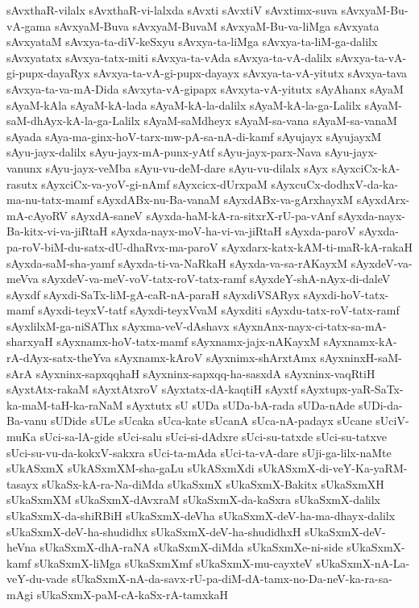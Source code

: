 {sAvxthaR-vilalx
sAvxthaR-vi-lalxda
sAvxti
sAvxtiV
sAvxtimx-suva
sAvxyaM-Bu-vA-gama
sAvxyaM-Buva
sAvxyaM-BuvaM
sAvxyaM-Bu-va-liMga
sAvxyata
sAvxyataM
sAvxya-ta-diV-keSxyu
sAvxya-ta-liMga
sAvxya-ta-liM-ga-dalilx
sAvxyatatx
sAvxya-tatx-miti
sAvxya-ta-vAda
sAvxya-ta-vA-dalilx
sAvxya-ta-vA-gi-pupx-dayaRyx
sAvxya-ta-vA-gi-pupx-dayayx
sAvxya-ta-vA-yitutx
sAvxya-tava
sAvxya-ta-va-mA-Dida
sAvxyta-vA-gipapx
sAvxyta-vA-yitutx
sAyAhanx
sAyaM
sAyaM-kAla
sAyaM-kA-lada
sAyaM-kA-la-dalilx
sAyaM-kA-la-ga-Lalilx
sAyaM-saM-dhAyx-kA-la-ga-Lalilx
sAyaM-saMdheyx
sAyaM-sa-vana
sAyaM-sa-vanaM
sAyada
sAya-ma-ginx-hoV-tarx-mw-pA-sa-nA-di-kamf
sAyujayx
sAyujayxM
sAyu-jayx-dalilx
sAyu-jayx-mA-punx-yAtf
sAyu-jayx-parx-Nava
sAyu-jayx-vanunx
sAyu-jayx-veMba
sAyu-vu-deM-dare
sAyu-vu-dilalx
sAyx
sAyxciCx-kA-rasutx
sAyxciCx-va-yoV-gi-nAmf
sAyxcicx-dUrxpaM
sAyxcuCx-dodhxV-da-ka-ma-nu-tatx-mamf
sAyxdABx-nu-Ba-vanaM
sAyxdABx-va-gArxhayxM
sAyxdArx-mA-cAyoRV
sAyxdA-saneV
sAyxda-haM-kA-ra-sitxrX-rU-pa-vAnf
sAyxda-nayx-Ba-kitx-vi-va-jiRtaH
sAyxda-nayx-moV-ha-vi-va-jiRtaH
sAyxda-paroV
sAyxda-pa-roV-biM-du-satx-dU-dhaRvx-ma-paroV
sAyxdarx-katx-kAM-ti-maR-kA-rakaH
sAyxda-saM-sha-yamf
sAyxda-ti-va-NaRkaH
sAyxda-va-sa-rAKayxM
sAyxdeV-va-meVva
sAyxdeV-va-meV-voV-tatx-roV-tatx-ramf
sAyxdeY-shA-nAyx-di-daleV
sAyxdf
sAyxdi-SaTx-liM-gA-caR-nA-paraH
sAyxdiVSARyx
sAyxdi-hoV-tatx-mamf
sAyxdi-teyxV-tatf
sAyxdi-teyxVvaM
sAyxditi
sAyxdu-tatx-roV-tatx-ramf
sAyxlilxM-ga-niSAThx
sAyxma-veV-dAshavx
sAyxnAnx-nayx-ci-tatx-sa-mA-sharxyaH
sAyxnamx-hoV-tatx-mamf
sAyxnamx-jajx-nAKayxM
sAyxnamx-kA-rA-dAyx-satx-theYva
sAyxnamx-kAroV
sAyxnimx-shArxtAmx
sAyxninxH-saM-sArA
sAyxninx-sapxqqhaH
sAyxninx-sapxqq-ha-sasxdA
sAyxninx-vaqRtiH
sAyxtAtx-rakaM
sAyxtAtxroV
sAyxtatx-dA-kaqtiH
sAyxtf
sAyxtupx-yaR-SaTx-ka-maM-taH-ka-raNaM
sAyxtutx
sU
sUDa
sUDa-bA-rada
sUDa-nAde
sUDi-da-Ba-vanu
sUDide
sULe
sUcaka
sUca-kate
sUcanA
sUca-nA-padayx
sUcane
sUciV-muKa
sUci-sa-lA-gide
sUci-salu
sUci-si-dAdxre
sUci-su-tatxde
sUci-su-tatxve
sUci-su-vu-da-kokxV-sakxra
sUci-ta-mAda
sUci-ta-vA-dare
sUji-ga-lilx-naMte
sUkASxmX
sUkASxmXM-sha-gaLu
sUkASxmXdi
sUkASxmX-di-veY-Ka-yaRM-tasayx
sUkaSx-kA-ra-Na-diMda
sUkaSxmX
sUkaSxmX-Bakitx
sUkaSxmXH
sUkaSxmXM
sUkaSxmX-dAvxraM
sUkaSxmX-da-kaSxra
sUkaSxmX-dalilx
sUkaSxmX-da-shiRBiH
sUkaSxmX-deVha
sUkaSxmX-deV-ha-ma-dhayx-dalilx
sUkaSxmX-deV-ha-shudidhx
sUkaSxmX-deV-ha-shudidhxH
sUkaSxmX-deV-heVna
sUkaSxmX-dhA-raNA
sUkaSxmX-diMda
sUkaSxmXe-ni-side
sUkaSxmX-kamf
sUkaSxmX-liMga
sUkaSxmXmf
sUkaSxmX-mu-cayxteV
sUkaSxmX-nA-La-veY-du-vade
sUkaSxmX-nA-da-savx-rU-pa-diM-dA-tamx-no-Da-neV-ka-ra-sa-mAgi
sUkaSxmX-paM-cA-kaSx-rA-tamxkaH
}
